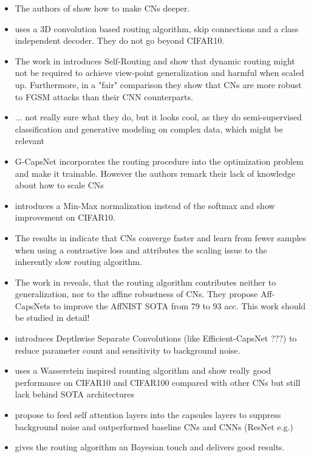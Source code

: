 \documentclass{article}
\begin{document}
\begin{itemize}
	\item The authors of \cite{DBLP:conf/icann/GugglbergerPR21} show how to make CNs deeper.
	\item \cite{cvpr/RajasegaranJJJS19} uses a 3D convolution based routing algorithm, skip connections and a class independent decoder. They do not go beyond CIFAR10.
	\item The work in \cite{nips/HahnPK19} introduces Self-Routing and show that dynamic routing might not be required to achieve view-point generalization and harmful when scaled up. Furthermore, in a "fair" comparison they show that CNs are more robust to FGSM attacks than their CNN counterparts.
	\item \cite{aaai/EdrakiRS20} ... not really sure what they do, but it looks cool, as they do semi-supervised classification and generative modeling on complex data, which might be relevant 
	\item G-CapsNet \cite{corr/Chen2018} incorporates the routing procedure into the optimization problem and make it trainable. However the authors remark their lack of knowledge about how to scale CNs
	\item \cite{corr/Zhao2019} introduces a Min-Max normalization instead of the softmax and show improvement on CIFAR10.
	\item The results in \cite{corr/ONeill2018} indicate that CNs converge faster and learn from fewer samples when using a contrastive loss and attributes the scaling issue to the inherently slow routing algorithm.
	\item The work in \cite{cvpr/GuT20} reveals, that the routing algorithm contributes neither to generalization, nor to the affine robustness of CNs. They propose Aff-CapsNets to improve the AffNIST SOTA from 79 to 93 acc. This work should be studied in detail!
	\item \cite{corr/Phong2020} introduces Depthwise Separate Convolutions (like Efficient-CapsNet ???) to reduce parameter count and sensitivity to background noise.
	\item \cite{corr/Fuchs2020} uses a Wasserstein inspired rounting algorithm and show really good performance on CIFAR10 and CIFAR100 compared with other CNs but still lack behind SOTA architectures
	\item \cite{corr/Hoogi2019} propose to feed self attention layers into the capsules layers to suppress background noise and outperformed baseline CNs and CNNs (ResNet e.g.)
	\item \cite{aaai/RibeiroLK20} gives the routing algorithm an Bayesian touch and delivers good results.

\end{itemize}
\end{document}
